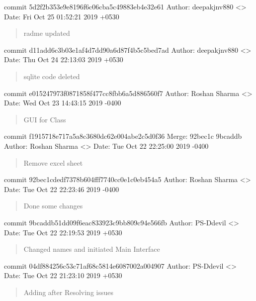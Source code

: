 \documentclass[letterpaper,10pt,english]{sphinxmanual}
\begin{document}
commit 5d2f2b353e9e8196f6c06cba5c49883eb4e32e61
Author: deepakjnv880 \textless{}\textgreater{}
Date:   Fri Oct 25 01:52:21 2019 +0530
\begin{quote}

radme updated
\end{quote}

commit d11add6c3b03e1af4d7dd90a6d87f4b5c5bed7ad
Author: deepakjnv880 \textless{}\textgreater{}
Date:   Thu Oct 24 22:13:03 2019 +0530
\begin{quote}

sqlite code deleted
\end{quote}

commit e015247973f0871858f477cc8fbb6a5d886560f7
Author: Roshan Sharma \textless{}\textgreater{}
Date:   Wed Oct 23 14:43:15 2019 -0400
\begin{quote}

GUI for Class
\end{quote}

commit f1915718e717a5a8c3680dc62e004abe2c5d0f36
Merge: 92bec1c 9bcaddb
Author: Roshan Sharma \textless{}\textgreater{}
Date:   Tue Oct 22 22:25:00 2019 -0400
\begin{quote}

Remove excel sheet
\end{quote}

commit 92bec1cdedf7378b604fff7740cc0e1c0eb454a5
Author: Roshan Sharma \textless{}\textgreater{}
Date:   Tue Oct 22 22:23:46 2019 -0400
\begin{quote}

Done some changes
\end{quote}

commit 9bcaddb51dd09f6eac833923c9bb809c94e566fb
Author: PS-Ddevil \textless{}\textgreater{}
Date:   Tue Oct 22 22:19:53 2019 +0530
\begin{quote}

Changed names and initiated Main Interface
\end{quote}

commit 04df884256c53c71af68c5814e6087002a004907
Author: PS-Ddevil \textless{}\textgreater{}
Date:   Tue Oct 22 21:23:10 2019 +0530
\begin{quote}

Adding after Resolving issues
\end{quote}
\end{document}

